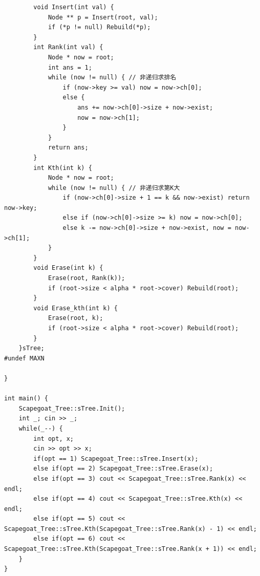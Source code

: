\documentclass[twoside]{article}
\begin{document}
\begin{lstlisting}
		void Insert(int val) {
			Node ** p = Insert(root, val);
			if (*p != null) Rebuild(*p);
		}
		int Rank(int val) {
			Node * now = root;
			int ans = 1;
			while (now != null) { // 非递归求排名 
				if (now->key >= val) now = now->ch[0];
				else {
					ans += now->ch[0]->size + now->exist;
					now = now->ch[1];
				}
			}
			return ans;
		}
		int Kth(int k) {
			Node * now = root;
			while (now != null) { // 非递归求第K大 
				if (now->ch[0]->size + 1 == k && now->exist) return now->key;
				else if (now->ch[0]->size >= k) now = now->ch[0];
				else k -= now->ch[0]->size + now->exist, now = now->ch[1];
			}
		}
		void Erase(int k) {
			Erase(root, Rank(k));
			if (root->size < alpha * root->cover) Rebuild(root);
		}
		void Erase_kth(int k) {
			Erase(root, k);
			if (root->size < alpha * root->cover) Rebuild(root);
		}
	}sTree;
#undef MAXN

}

int main() {
    Scapegoat_Tree::sTree.Init();
    int _; cin >> _;
    while(_--) {
        int opt, x;
        cin >> opt >> x;
        if(opt == 1) Scapegoat_Tree::sTree.Insert(x);
        else if(opt == 2) Scapegoat_Tree::sTree.Erase(x);
        else if(opt == 3) cout << Scapegoat_Tree::sTree.Rank(x) << endl;
        else if(opt == 4) cout << Scapegoat_Tree::sTree.Kth(x) << endl;
        else if(opt == 5) cout << Scapegoat_Tree::sTree.Kth(Scapegoat_Tree::sTree.Rank(x) - 1) << endl;
        else if(opt == 6) cout << Scapegoat_Tree::sTree.Kth(Scapegoat_Tree::sTree.Rank(x + 1)) << endl;
    }
}\end{lstlisting}
\end{document}
